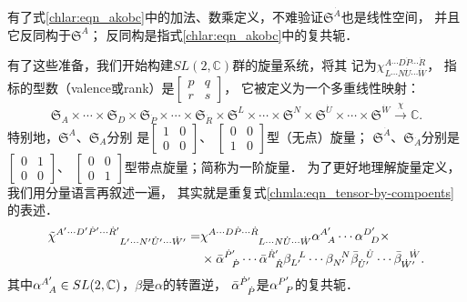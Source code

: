 有了式\eqref{chlar:eqn_akobc}中的加法、数乘定义，不难验证$\mathfrak{S}^{\dot{A}}$也是线性空间，
并且它{\kaishu 反同构}于$\mathfrak{S}^{A}$；
反同构是指式\eqref{chlar:eqn_akobc}中的复共轭．

有了这些准备，我们开始构建$SL(2,\mathbb{C})$群的{\heiti 旋量系统}，将其
记为$\chi^{A\cdots D \dot{P}\cdots \dot{R}}_{L\cdots N \dot{U}\cdots \dot{W}}$，
指标的型数（valence或rank）是$\left[\begin{smallmatrix} p & q \\ r & s \end{smallmatrix}\right]$，
它被定义为一个多重线性映射\cite[p.108]{penrose-Rindler1984}：  
\begin{equation*}
\mathfrak{S}_A\times \cdots \times \mathfrak{S}_D\times
\mathfrak{S}_{\dot{P}} \times \cdots \times\mathfrak{S}_{\dot{R}} \times 
\mathfrak{S}^L\times \cdots \times \mathfrak{S}^N\times
\mathfrak{S}^{\dot{U}} \times \cdots \times\mathfrak{S}^{\dot{W}} 
\xrightarrow{\chi} \mathbb{C} .
\end{equation*}
特别地，$\mathfrak{S}^{A}$、$\mathfrak{S}_{A}$分别
是$\left[\begin{smallmatrix} 1 & 0 \\ 0&0 \end{smallmatrix}\right]$、
$\left[\begin{smallmatrix} 0 &0\\ 1&0 \end{smallmatrix}\right]$型（无点）旋量；
$\mathfrak{S}^{\dot{A}}$、$\mathfrak{S}_{\dot{A}}$分别是
$\left[\begin{smallmatrix} 0&1 \\ 0&0 \end{smallmatrix}\right]$、
$\left[\begin{smallmatrix} 0&0 \\ 0&1 \end{smallmatrix}\right]$型带点旋量；简称为一阶旋量．
为了更好地理解旋量定义，我们用分量语言再叙述一遍，
其实就是重复式\eqref{chmla:eqn_tensor-by-compoents}的表述．
\begin{align}
    \tilde{\chi}^{A'\cdots D' \dot{P}'\cdots \dot{R}'}_{\hphantom{A'\cdots D' \dot{P}'\cdots \dot{R}'}L'\cdots N' \dot{U}'\cdots \dot{W}'}
    =&\chi^{A\cdots D \dot{P}\cdots \dot{R}}_{\hphantom{A\cdots D \dot{P}\cdots \dot{R}}L\cdots N \dot{U}\cdots \dot{W}} 
     \alpha_{\hphantom{A} A}^{A'} \cdots \alpha_{\hphantom{A} D}^{D'} \times \notag \\
    &\times \bar{\alpha}_{\hphantom{A} \dot{P}}^{\dot{P}'} \cdots \bar{\alpha}_{\hphantom{A} \dot{R}}^{\dot{R}'}
    \beta^{\hphantom{A} L}_{L'} \cdots \beta^{\hphantom{A} N}_{N'}
    \bar{\beta}^{\hphantom{A} \dot{U}}_{\dot{U}'} \cdots \bar{\beta}^{\hphantom{A} \dot{W}}_{\dot{W}'} . 
    \label{chlar:eqn_spin-comp}
\end{align}
其中$\alpha_{\hphantom{A} A}^{A'}\in SL(2,\mathbb{C})$，$\beta$是$\alpha$的转置逆，
$\bar{\alpha}_{\hphantom{A} \dot{P}}^{\dot{P}'}$是$\alpha_{\hphantom{A} {P}}^{{P}'}$的复共轭．

